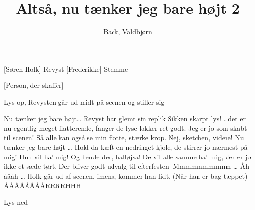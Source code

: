 \documentclass[a4paper,11pt]{article}
\title{Altså, nu tænker jeg bare højt 2}
\author{Back, Valdbjørn}
\begin{document}
\maketitle

\begin{roles}
    [Søren Holk] Revyst
    [Frederikke] Stemme
\end{roles}

\begin{props}
    [Person, der skaffer]
\end{props}


\begin{sketch}

\scene Lys op, Revysten går ud midt på scenen og stiller sig 

 Nu tænker jeg bare højt\ldots
\scene Revyst har glemt sin replik
 Sikken skarpt lys! \ldots det er nu egentlig meget flatterende, fanger de lyse lokker ret godt.
 Jeg er jo som skabt til scenen! Så alle kan også se min flotte, stærke krop.
 Nej, sketchen, videre! 
 Nu tænker jeg bare højt \ldots
{} Hold da kæft en nedringet kjole, de stirrer jo nærmest på mig!
 Hun vil ha' mig! Og hende der, halløjsa! De vil alle samme ha' mig, der er jo ikke et sæde tørt. 
 Der bliver godt udvalg til efterfesten! Mmmmmmmmmm \ldots
{} Åh åååh \ldots
\scene Holk går ud af scenen, imens, kommer han lidt. 
 (Når han er bag tæppet) ÅÅÅÅÅÅÅÅRRRRHHH

\scene Lys ned 
\end{sketch}
\end{document}
